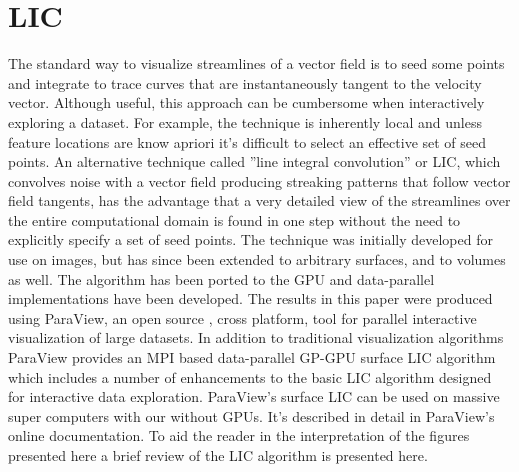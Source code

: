 \documentclass[a4paper,10pt]{article}
\begin{document}
\section{LIC}
The standard way to visualize streamlines of a vector field is to seed some points and integrate to trace curves that are instantaneously tangent to the velocity vector. Although useful, this approach can be cumbersome when interactively exploring a dataset. For example, the technique is inherently local and unless feature locations are know apriori it's difficult to select an effective set of seed points. An alternative technique called ”line integral convolution” or LIC, which convolves noise with a vector field producing streaking patterns that follow vector field tangents, has the advantage that a very detailed view of the streamlines over the entire computational domain is found in one step without the need to explicitly specify a set of seed points. The technique was initially developed for use on images\cite{LIC1}, but has since been extended to arbitrary surfaces\cite{LIC2}, and to volumes as well\cite{LIC3}. The algorithm has been ported to the GPU\cite{LIC5} and data-parallel implementations have been developed\cite{LIC4}. The results in this paper were produced using ParaView\cite{PV}, an open source , cross platform, tool for parallel  interactive visualization of large datasets. In addition to traditional visualization algorithms ParaView provides an MPI based data-parallel GP-GPU surface LIC algorithm which includes a number of enhancements to the basic LIC algorithm designed for interactive data exploration. ParaView's surface LIC can be used on massive super computers with our without GPUs. It's described in detail in ParaView's online documentation\cite{PV2}. To aid the reader in the interpretation of the figures presented here a brief review of the LIC algorithm is presented here.
\end{document}
